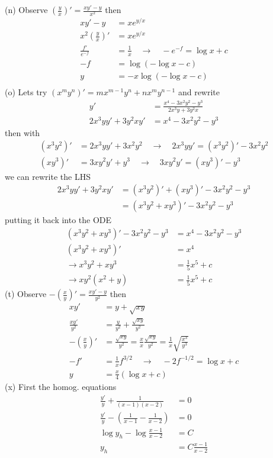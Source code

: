 \documentclass[../main.tex]{subfiles}
\begin{document}
(n) Observe $\left(\frac{y}{x}\right)'=\frac{xy'-y}{x^2}$ then
\begin{align}
xy'-y&=xe^{y/x}\\
x^2\left(\frac{y}{x}\right)'&=xe^{y/x}\\
\frac{f'}{e^{-f}}&=\frac{1}{x}\quad\rightarrow\quad -e^{-f}=\log x+c\\
-f&=\log(-\log x-c)\\
y&=-x\log(-\log x-c)\\
\end{align}
(o) Lets try $(x^my^n)'=mx^{m-1}y^n+nx^my^{n-1}$ and rewrite
\begin{align}
y'&=\frac{x^4-3x^2y^2-y^3}{2x^3y+3y^2x}\\
2x^3yy'+3y^2xy'&=x^4-3x^2y^2-y^3
\end{align}
then with
\begin{align}
(x^3y^2)'&=2x^3yy'+3x^2y^2\quad\rightarrow\quad2x^3yy'=(x^3y^2)'-3x^2y^2\\
(xy^3)'&=3xy^2y'+y^3\quad\rightarrow\quad3xy^2y'=(xy^3)'-y^3
\end{align}
we can rewrite the LHS
\begin{align}
2x^3yy'+3y^2xy'&=(x^3y^2)'+(xy^3)'-3x^2y^2-y^3\\
&=(x^3y^2+xy^3)'-3x^2y^2-y^3
\end{align}
putting it back into the ODE
\begin{align}
(x^3y^2+xy^3)'-3x^2y^2-y^3&=x^4-3x^2y^2-y^3\\
(x^3y^2+xy^3)'&=x^4\\
\rightarrow x^3y^2+xy^3&=\frac{1}{5}x^5+c\\
\rightarrow xy^2(x^2+y)&=\frac{1}{5}x^5+c
\end{align}
(t) Observe $-\left(\frac{x}{y}\right)'=\frac{xy'-y}{y^2}$ then
\begin{align}
xy'&=y+\sqrt{xy}\\
\frac{xy'}{y^2}&=\frac{y}{y^2}+\frac{\sqrt{xy}}{y^2}\\
-\left(\frac{x}{y}\right)'&=\frac{\sqrt{xy}}{y^2}=\frac{x}{x}\frac{\sqrt{xy}}{y^2}=\frac{1}{x}\sqrt{\frac{x^3}{y^3}}\\
-f'&=\frac{1}{x}f^{3/2}\quad\rightarrow\quad-2f^{-1/2}=\log x+c\\
y&=\frac{x}{4}(\log x+c)
\end{align}
(x) First the homog. equations
\begin{align}
\frac{y'}{y}+\frac{1}{(x-1)(x-2)}&=0\\
\frac{y'}{y}-\left(\frac{1}{x-1}-\frac{1}{x-2}\right)&=0\\
\log y_h-\log\frac{x-1}{x-2}&=C\\
y_h&=C\frac{x-1}{x-2}
\end{align}
\end{document}
